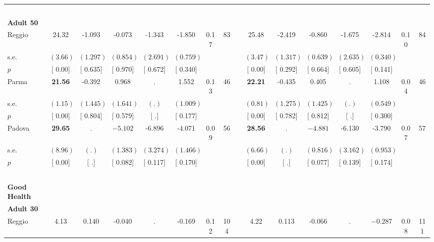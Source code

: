 \begin{longtable}{L{8em} c c c c c c c p{1em} c c c c c c c}
~\\[1em]
\quad \quad \textbf{Adult 50} & & & & & & & & & & & & & & & \\* 
\quad \quad \quad Reggio& 24.32 &    -1.093 &    -0.073 &    -1.343 &    -1.850 &      0.17 &        83 & & 25.48 &    -2.419 &    -0.860 &    -1.675 &    -2.814 &      0.10 &        84  \\*
\quad \quad \quad \quad s.e.& $ (     3.66)$ & $ (    1.297)$ & $ (    0.854)$ & $ (    2.691)$ & $ (    0.759)$ & & & & $ (     3.47)$ & $ (    1.317)$ & $ (    0.639)$ & $ (    2.635)$ & $ (    0.340)$ & &  \\*
\quad \quad \quad \quad $ p$ & [     0.00] & [    0.635] & [    0.970] & [    0.672] & [    0.340] & & & & [     0.00] & [    0.292] & [    0.664] & [    0.605] & [    0.141] & &  \\[1em]
\quad \quad \quad Parma& \textbf{    21.56} &    -0.392 &     0.968 &         . &     1.552 &      0.13 &        46 & & \textbf{    22.21} &    -0.435 &     0.405 &         . &     1.108 &      0.04 &        46  \\*
\quad \quad \quad \quad s.e.& $ (     1.15)$ & $ (    1.445)$ & $ (    1.641)$ & $ (        .)$ & $ (    1.009)$ & & & & $ (     0.81)$ & $ (    1.275)$ & $ (    1.425)$ & $ (        .)$ & $ (    0.549)$ & &  \\*
\quad \quad \quad \quad $ p$ & [     0.00] & [    0.804] & [    0.579] & [        .] & [    0.177] & & & & [     0.00] & [    0.782] & [    0.812] & [        .] & [    0.300] & &  \\[1em]
\quad \quad \quad Padova& \textbf{    29.65} &         . & $ \mathbf{   -5.102}$ &    -6.896 &    -4.071 &      0.09 &        56 & & \textbf{    28.56} &         . & $ \mathbf{   -4.881}$ &    -6.130 &    -3.790 &      0.07 &        57  \\*
\quad \quad \quad \quad s.e.& $ (     8.96)$ & $ (        .)$ & $ (    1.383)$ & $ (    3.274)$ & $ (    1.466)$ & & & & $ (     6.66)$ & $ (        .)$ & $ (    0.816)$ & $ (    3.162)$ & $ (    0.953)$ & &  \\*
\quad \quad \quad \quad $ p$ & [     0.00] & [        .] & [    0.082] & [    0.117] & [    0.170] & & & & [     0.00] & [        .] & [    0.077] & [    0.139] & [    0.174] & &  \\[1em]
~\\[1em]
\textbf{Good Health} \\*
\quad \quad \textbf{Adult 30} & & & & & & & & & & & & & & & \\* 
\quad \quad \quad Reggio& 4.13 &     0.140 &    -0.040 &         . &    -0.169 &      0.12 &       104 & & 4.22 &     0.113 &    -0.066 &         . & $ \mathbf{   -0.287}$ &      0.08 &       111  \\*

\end{longtable}
